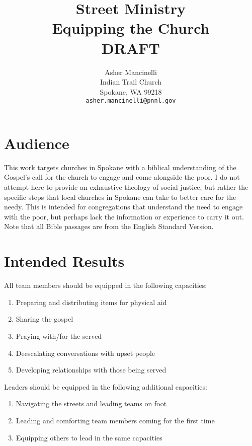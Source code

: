 \documentclass[12pt]{article}
\title{Street Ministry \\
        \large Equipping the Church \\
        \ifdefined\isedit
        \large DRAFT
        \fi}
\author{Asher Mancinelli \\
        Indian Trail Church \\
        Spokane, WA 99218 \\
        \texttt{asher.mancinelli@pnnl.gov} \\ }
\begin{document}
\maketitle



\clearpage

\section{Audience}

    This work targets churches in Spokane with a biblical understanding of the Gospel's call for the church to engage and come alongside the poor.
    I do not attempt here to provide an exhaustive theology of social justice, but rather the specific steps that local churches in Spokane can take to better care for the needy.
    This is intended for congregations that understand the need to engage with the poor, but perhaps lack the information or experience to carry it out.
    Note that all Bible passages are from the English Standard Version\cite{esv2016}.


\section{Intended Results}

    All team members should be equipped in the following capacities:
    \begin{enumerate}
        \item Preparing and distributing items for physical aid
        \item Sharing the gospel
        \item Praying with/for the served
        \item Deescalating conversations with upset people
        \item Developing relationships with those being served
    \end{enumerate}

    Leaders should be equipped in the following additional capacities:
    \begin{enumerate}
        \item Navigating the streets and leading teams on foot
        \item Leading and comforting team members coming for the first time
        \item Equipping others to lead in the same capacities
    \end{enumerate}
\end{document}
